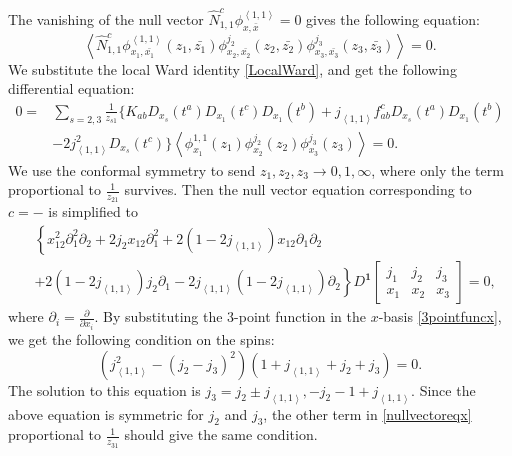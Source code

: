 \documentclass[10pt,a4paper]{article}
\numberwithin{equation}{section}
\newcommand{\vev}[1]{\left\langle #1 \right\rangle}
\begin{document}
The vanishing of the null vector $\hat{N}^{c}_{1,1} \phi^{\vev{1,1}}_{x,\bar{x}} = 0$ gives the following equation:
\begin{equation}
    \vev{\hat{N}^{c}_{1,1} \phi^{\vev{1,1}}_{x_{1},\bar{x_{1}}}(z_{1},\bar{z_{1}}) \phi^{j_{2}}_{x_{2},\bar{x_{2}}}(z_{2},\bar{z_{2}})
     \phi^{j_{3}}_{x_{3},\bar{x_{3}}}(z_{3}, \bar{z_{3}})} = 0.
\end{equation}
We substitute the local Ward identity \eqref{LocalWard}, and get the following differential 
equation:
\begin{equation}
    \begin{aligned}
        0 = &\sum_{s=2,3} \frac{1}{z_{s1}}
        \Big\{ K_{a b} D_{x_s}\left(t^a\right) D_{x_1}\left(t^c\right) D_{x_1}\left(t^b\right)+ j_{\vev{1,1}} f_{a b}^c D_{x_s}\left(t^a\right) D_{x_1}\left(t^b\right) \\
        & - 2 j_{\vev{1,1}}^2 D_{x_s}\left(t^c\right) \Big\}
        \vev{\phi^{1,1}_{x_{1}}(z_{1}) \phi^{j_{2}}_{x_{2}}(z_{2}) \phi^{j_{3}}_{x_{3}}(z_{3})}  = 0.
    \end{aligned}
     \label{nullvectoreqx}
\end{equation}
We use the conformal symmetry to send $z_{1}, z_{2}, z_{3} \rightarrow 0,1,\infty$, where only the term proportional to $\frac{1}{z_{21}}$ 
survives. Then the null vector equation corresponding to $c=-$ is simplified to 
\begin{equation}
    \begin{aligned}
        &\left\{ x_{12}^2 \partial_{1}^{2} \partial_{2} + 2 j_{2} x_{12} \partial_{1}^{2} + 2 (1-2j_{\vev{1,1}})x_{12} \partial_{1}\partial_{2} \right. \\
        &\left. + 2 (1-2j_{\vev{1,1}})j_{2} \partial_{1} -2j_{\vev{1,1}}(1-2j_{\vev{1,1}}) \partial_{2} \right\} D^{\mathbf{1}} \left[\begin{array}{ccc}
    j_{1} & j_2 & j_3 \\
    x_1 & x_2 & x_3
    \end{array} \right] = 0 ,
    \end{aligned}
\end{equation}
where $\partial_{i} = \frac{\partial}{\partial x_{i}}$. By substituting the 3-point function in the $x$-basis \eqref{3pointfuncx}, we get the following condition on the spins: 
\begin{equation}
    \left( j_{\vev{1,1}}^{2} - (j_{2}-j_{3})^{2} \right)(1+j_{\vev{1,1}}+j_{2}+j_{3}) = 0.
\end{equation}
The solution to this equation is $j_{3} = j_{2} \pm j_{\vev{1,1}}, -j_{2} - 1 + j_{\vev{1,1}}$. Since the above equation 
is symmetric for $j_{2}$ and $j_{3}$, the other term in \eqref{nullvectoreqx} proportional to $\frac{1}{z_{31}}$ should give 
the same condition. 
\end{document}
